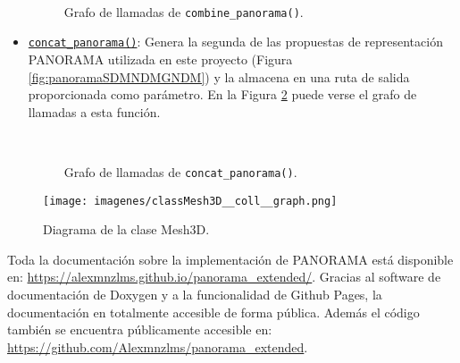 \begin{itemize}
    \begin{figure}[ht!]
        \centering
        \\
        \caption{Grafo de llamadas de \texttt{combine\_panorama()}.}
        \label{fig:combinepanorama}
    \end{figure}
    \item \href{https://alexmnzlms.github.io/panorama_extended/classMesh3D.html#a5d8447c5025429061006dd3fb2d4632b}{\texttt{concat\_panorama()}}: Genera la segunda de las propuestas de representación PANORAMA utilizada en este proyecto (Figura \ref{fig:panoramaSDMNDMGNDM}) y la almacena en una ruta de salida proporcionada como parámetro. En la Figura \ref{fig:concatpanorama} puede verse el grafo de llamadas a esta función.
    \begin{figure}[ht!]
        \centering
        \\
        \caption{Grafo de llamadas de \texttt{concat\_panorama()}.}
        \label{fig:concatpanorama}
    \end{figure}
\end{itemize}

\begin{figure}[ht!]
    \centering
    \texttt{[image: imagenes/classMesh3D\_\_coll\_\_graph.png]}
    \caption{Diagrama de la clase Mesh3D.}
    \label{fig:mesh3d}
\end{figure}

Toda la documentación sobre la implementación de PANORAMA está disponible en: \url{https://alexmnzlms.github.io/panorama_extended/}. Gracias al software de documentación de Doxygen y a la funcionalidad de Github Pages, la documentación en totalmente accesible de forma pública. Además el código también se encuentra públicamente accesible en: \url{https://github.com/Alexmnzlms/panorama_extended}.\\


